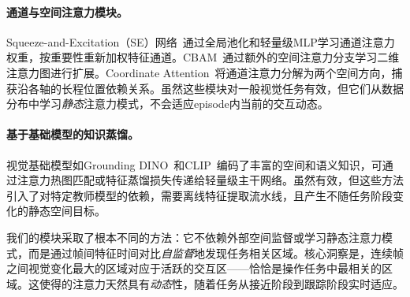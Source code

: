 \paragraph{通道与空间注意力模块。}Squeeze-and-Excitation（SE）网络~\cite{hu2018squeeze}通过全局池化和轻量级MLP学习通道注意力权重，按重要性重新加权特征通道。CBAM~\cite{woo2018cbam}通过额外的空间注意力分支学习二维注意力图进行扩展。Coordinate Attention~\cite{hou2021coordinate}将通道注意力分解为两个空间方向，捕获沿各轴的长程位置依赖关系。虽然这些模块对一般视觉任务有效，但它们从数据分布中学习\emph{静态}注意力模式，不会适应episode内当前的交互动态。

\paragraph{基于基础模型的知识蒸馏。}视觉基础模型如Grounding DINO~\cite{liu2023grounding}和CLIP~\cite{radford2021learning}编码了丰富的空间和语义知识，可通过注意力热图匹配或特征蒸馏损失传递给轻量级主干网络。虽然有效，但这些方法引入了对特定教师模型的依赖，需要离线特征提取流水线，且产生不随任务阶段变化的静态空间目标。

我们的\fasa{}模块采取了根本不同的方法：它不依赖外部空间监督或学习静态注意力模式，而是通过帧间特征时间对比\emph{自监督}地发现任务相关区域。核心洞察是，连续帧之间视觉变化最大的区域对应于活跃的交互区——恰恰是操作任务中最相关的区域。这使得\fasa{}的注意力天然具有\emph{动态}性，随着任务从接近阶段到跟踪阶段实时适应。
